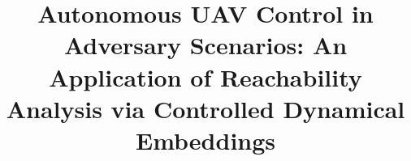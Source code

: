 \documentclass[letterpaper,10pt,conference]{ieeeconf}
\begin{document}
\newcommand{\g}{\ensuremath{\mathbf{g}}} %
\newcommand{\J}{\ensuremath{\mathbf{J}}} %

\newcommand{\xD}{\ensuremath{\mathbf{x}}} %
\newcommand{\pD}{\ensuremath{\mathbf{p}}} %
\newcommand{\vD}{\ensuremath{\mathbf{v}}} %
\newcommand{\dcmD}{\ensuremath{\mathbf{A}}} %
\newcommand{\wD}{\ensuremath{\mathbf{w}}} %
\newcommand{\uD}{\ensuremath{\mathbf{u}}} %

\newcommand{\xA}{\ensuremath{\mathbf{z}}} %
\newcommand{\pA}{\ensuremath{\mathbf{d}}} %
\newcommand{\vA}{\ensuremath{\mathbf{s}}} %
\newcommand{\dcmA}{\ensuremath{\mathbf{R}}} %
\newcommand{\wA}{\ensuremath{\mathbf{o}}} %

\newcommand{\ED}{\ensuremath{\Phi}} %
\newcommand{\EA}{\ensuremath{\Psi}} %
\newcommand{\RD}{\ensuremath{\mathcal{D}}} %
\newcommand{\RA}{\ensuremath{\mathcal{A}}} %
\newcommand{\RS}{\ensuremath{\mathcal{S}}} %
\newcommand{\ES}{\ensuremath{\Upsilon}} %

\newcommand{\alphaD}{\ensuremath{\mathbf{\alpha}}} %
\newcommand{\yD}{\ensuremath{y}} %
\newcommand{\alphaA}{\ensuremath{\mathbf{\gamma}}} %
\newcommand{\yA}{\ensuremath{r}} %

\newcommand{\vm}[1]{%
\ensuremath{\mathbf{#1}}
} %

\newcommand{\KLD}[2]{\ensuremath{\kappa(#1,#2)}} %
\newcommand{\bKLD}[2]{\ensuremath{K(#1,#2)}} %

\newcommand{\LSE}[1]{\ensuremath{l (#1)}} %

\newcommand{\ellip}[2]{\ensuremath{\varepsilon (#1,#2)}}

\newcommand{\so}[1]{[#1]_{\times}} %

\title{Autonomous UAV Control in Adversary Scenarios: An Application of Reachability Analysis via Controlled Dynamical Embeddings
}
\end{document}
